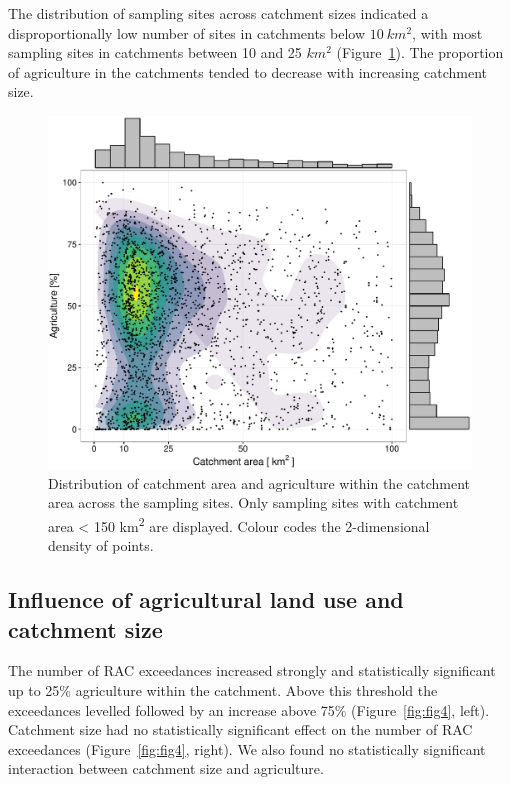 \documentclass[journal=esthag,manuscript=article]{achemso}
\begin{document}
The distribution of sampling sites across catchment sizes indicated a disproportionally low number of sites in catchments below $10~km^2$, with most sampling sites in catchments between 10 and 25 $km^2$ (Figure~\ref{fig:fig3}).
The proportion of agriculture in the catchments tended to decrease with increasing catchment size.

\begin{figure}[ht]
  \includegraphics[width=.8\textwidth]{figure3.pdf}
  \caption{Distribution of catchment area and agriculture within the catchment area across the sampling sites.
  Only sampling sites with catchment area < 150 km\textsuperscript{2} are displayed. 
  Colour codes the 2-dimensional density of points.}
  \label{fig:fig3}
\end{figure}


\subsection{Influence of agricultural land use and catchment size}
The number of RAC exceedances increased strongly and statistically significant up to 25\% agriculture within the catchment.
Above this threshold the exceedances levelled followed by an increase above 75\% (Figure~\ref{fig:fig4}, left).
Catchment size had no statistically significant effect on the number of RAC exceedances (Figure~\ref{fig:fig4}, right).
We also found no statistically significant interaction between catchment size and agriculture.
\end{document}
